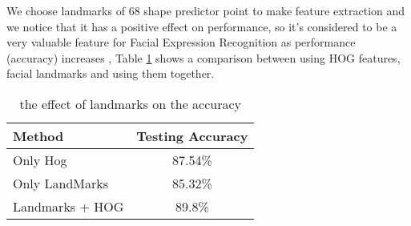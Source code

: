 We choose landmarks of 68 shape predictor point to make feature extraction and we notice that it has a positive effect on performance, so it's considered to be a very valuable feature for Facial Expression Recognition as performance (accuracy) increases , Table \ref{tab:CH3landmarks} shows a comparison between using HOG features,  facial landmarks and  using them together.
\begin{table}[h!]
	\begin{center}
		\caption{the effect of landmarks on the accuracy}
		\label{tab:CH3landmarks}
		\begin{tabular}{l|c}
			\textbf{Method} & \textbf{Testing Accuracy}     \\
			\hline
			Only Hog & 87.54\% \\ 
			Only LandMarks & 85.32\%  \\
			Landmarks + HOG & 89.8\% \\
		\end{tabular}
	\end{center}
\end{table}



